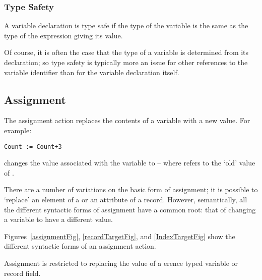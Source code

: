 \subsubsection{Type Safety}
A variable declaration is type safe if the type of the variable is the same as the type of the expression giving its value.
\begin{aside}
Of course, it is often the case that the type of a variable is determined from its declaration; so type safety is typically more an issue for other references to the variable identifier than for the variable declaration itself.
\end{aside}

\begin{prooftree}
\end{prooftree}

\begin{prooftree}
\end{prooftree}

\subsection{Assignment}
\label{assignment}
The assignment action \q{:=} replaces the contents of a variable with a new value. For example:
\begin{lstlisting}
Count := Count+3
\end{lstlisting}
changes the value associated with the variable  to  -- where  refers to the `old' value of .

There are a number of variations on the basic form of assignment; it is possible to `replace' an element of a  or an attribute of a record. However, semantically, all the different syntactic forms of assignment have a common root: that of changing a variable to have a different value.

Figures~\vref{assignmentFig}, \vref{recordTargetFig}, and \vref{IndexTargetFig} show the different syntactic forms of an assignment action.

\begin{aside}
Assignment is restricted to replacing the value of a erence typed variable or record field.
\end{aside}

